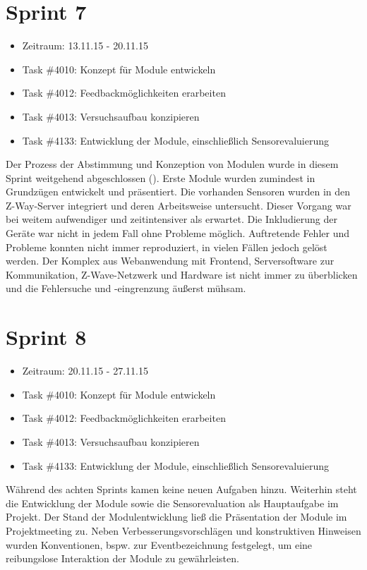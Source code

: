 \documentclass[12pt, oneside, smallheadings]{scrbook}
\begin{document}
\section{Sprint 7}
\begin{itemize}
	\item Zeitraum: 13.11.15 - 20.11.15 \newline
	\item Task \#4010: Konzept für Module entwickeln
	\item Task \#4012: Feedbackmöglichkeiten erarbeiten
	\item Task \#4013: Versuchsaufbau konzipieren
	\item Task \#4133: Entwicklung der Module, einschließlich Sensorevaluierung\\
\end{itemize}
\noindent
Der Prozess der Abstimmung und Konzeption von Modulen wurde in diesem Sprint weitgehend abgeschlossen (). Erste Module wurden zumindest in Grundzügen entwickelt und präsentiert. Die vorhanden Sensoren wurden in den Z-Way-Server integriert und deren Arbeitsweise untersucht. Dieser Vorgang war bei weitem aufwendiger und zeitintensiver als erwartet. Die Inkludierung der Geräte war nicht in jedem Fall ohne Probleme möglich. Auftretende Fehler und Probleme konnten nicht immer reproduziert, in vielen Fällen jedoch gelöst werden.
Der Komplex aus Webanwendung mit Frontend, Serversoftware zur Kommunikation, Z-Wave-Netzwerk und Hardware ist nicht immer zu überblicken und die Fehlersuche und -eingrenzung äußerst mühsam.%

\section{Sprint 8}
\begin{itemize}
	\item Zeitraum: 20.11.15 - 27.11.15 \newline
	\item Task \#4010: Konzept für Module entwickeln
	\item Task \#4012: Feedbackmöglichkeiten erarbeiten
	\item Task \#4013: Versuchsaufbau konzipieren
	\item Task \#4133: Entwicklung der Module, einschließlich Sensorevaluierung\\
\end{itemize}
\noindent
Während des achten Sprints kamen keine neuen Aufgaben hinzu. Weiterhin steht die Entwicklung der Module sowie die Sensorevaluation als Hauptaufgabe im Projekt. Der Stand der Modulentwicklung ließ die Präsentation der Module im Projektmeeting zu. Neben Verbesserungsvorschlägen und konstruktiven Hinweisen wurden Konventionen, bspw. zur Eventbezeichnung festgelegt, um eine reibungslose Interaktion der Module zu gewährleisten.
\end{document}

